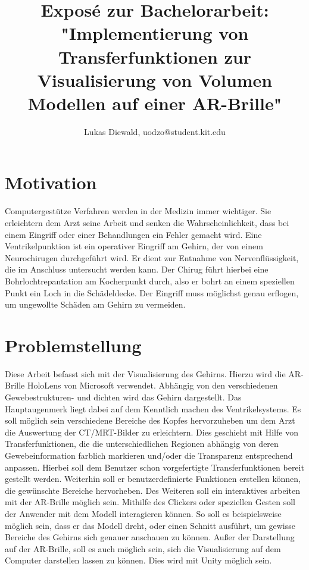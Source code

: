 \documentclass{article}
\title{
Exposé zur Bachelorarbeit:\\
 \textbf{"Implementierung von Transferfunktionen zur Visualisierung von Volumen Modellen auf einer AR-Brille"}
}
\author{Lukas Diewald, uodzo@student.kit.edu}
\begin{document}
\maketitle

\section{Motivation}

Computergestütze Verfahren werden in der Medizin immer wichtiger. Sie erleichtern dem Arzt seine Arbeit und senken die Wahrscheinlichkeit, dass bei einem Eingriff oder einer Behandlungen ein Fehler gemacht wird.
\newline
Eine Ventrikelpunktion ist ein operativer Eingriff am Gehirn, der von einem Neurochirugen durchgeführt wird. Er dient zur Entnahme von Nervenflüssigkeit, die im Anschluss untersucht werden kann. Der Chirug führt hierbei eine Bohrlochtrepantation am Kocherpunkt durch, also er bohrt an einem speziellen Punkt ein Loch in die Schädeldecke. Der Eingriff muss möglichst genau erflogen, um ungewollte Schäden am Gehirn zu vermeiden.


\section{Problemstellung}

Diese Arbeit befasst sich mit der Visualisierung des Gehirns. Hierzu wird die AR-Brille  HoloLens von Microsoft verwendet. Abhängig von den verschiedenen Gewebestrukturen- und dichten wird das Gehirn dargestellt. Das Hauptaugenmerk liegt dabei auf dem Kenntlich machen des Ventrikelsystems.
\newline
Es soll möglich sein verschiedene Bereiche des Kopfes hervorzuheben um dem Arzt die Auswertung der CT/MRT-Bilder zu erleichtern. Dies geschieht mit Hilfe von Transferfunktionen, die die unterschiedlichen Regionen abhängig von deren Gewebeinformation farblich markieren und/oder die Transparenz entsprechend anpassen. Hierbei soll dem Benutzer schon vorgefertigte Transferfunktionen bereit gestellt werden. Weiterhin soll er benutzerdefinierte Funktionen erstellen können, die gewünschte Bereiche hervorheben.
\newline
Des Weiteren soll ein interaktives arbeiten mit der AR-Brille möglich sein. Mithilfe des Clickers oder speziellen Gesten soll der Anwender mit dem Modell interagieren können. So soll es beispielsweise möglich sein, dass er das Modell dreht, oder einen Schnitt ausführt, um gewisse Bereiche des Gehirns sich genauer anschauen zu können.
\newline
Außer der Darstellung auf der AR-Brille, soll es auch möglich sein, sich die Visualisierung auf dem Computer darstellen lassen zu können. Dies wird mit Unity möglich sein.
\end{document}
